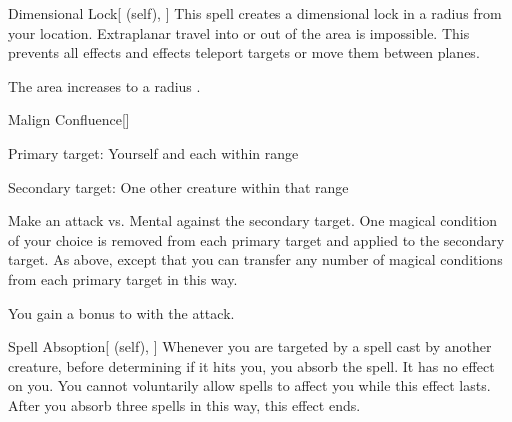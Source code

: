 \lowercase{\hypertarget{spell:Dimensional Lock}{}}\label{spell:Dimensional Lock}
\begin{attuneability}[Rank 6]{\hypertarget{spell:Dimensional Lock}{Dimensional Lock}}[ (self), ]
\targetrule
This spell creates a dimensional lock in a \arealarge radius  from your location.
Extraplanar travel into or out of the area is impossible.
This prevents all  effects and effects teleport targets or move them between planes.

\rankline
{} The area increases to a \areahuge radius .

\end{attuneability}
\vspace{0.25em}



\lowercase{\hypertarget{spell:Malign Confluence}{}}\label{spell:Malign Confluence}
\begin{freeability}[Rank 6]{\hypertarget{spell:Malign Confluence}{Malign Confluence}}[]

Primary target: Yourself and each  within \rngmed range
\par\noindent
Secondary target: One other creature within that range

Make an attack vs. Mental against the secondary target.
\hit One magical condition of your choice is removed from each primary target and applied to the secondary target.
\crit As above, except that you can transfer any number of magical conditions from each primary target in this way.

\rankline
{} You gain a  bonus to  with the attack.

\end{freeability}
\vspace{0.25em}



\lowercase{\hypertarget{spell:Spell Absoption}{}}\label{spell:Spell Absoption}
\begin{attuneability}[Rank 7]{\hypertarget{spell:Spell Absoption}{Spell Absoption}}[ (self), ]
Whenever you are targeted by a spell cast by another creature, before determining if it hits you, you absorb the spell.
It has no effect on you.
You cannot voluntarily allow spells to affect you while this effect lasts.
After you absorb three spells in this way, this effect ends.

\end{attuneability}
\vspace{0.25em}



